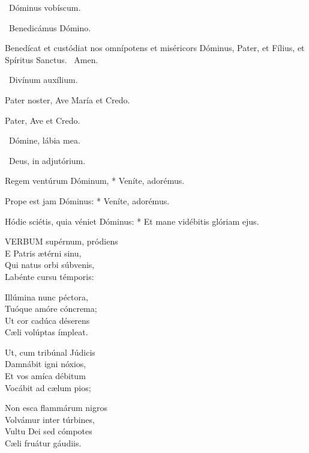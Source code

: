 \V\ Dóminus vobíscum.

\V\ Benedicámus Dómino.

 Benedícat et custódiat nos omnípotens et miséricors Dóminus, Pater, et Fílius, et Spíritus Sanctus. \R\ Amen.


\V\ Divínum auxílium.

Pater noster, Ave María et Credo.

\sectionornament



Pater, Ave et Credo.

\V\ Dómine, lábia mea.

\V\ Deus, in adjutórium.



 Regem ventúrum Dóminum, * Veníte, adorémus.


 Prope est jam Dóminus: * Veníte, adorémus.


 Hódie sciétis, quia véniet Dóminus: * Et mane vidébitis glóriam ejus.


\lettrine[lines=2]{V}{ERBUM} supérnum, pródiens\\
E Patris ætérni sinu,\\
Qui natus orbi súbvenis,\\
Labénte cursu témporis:

Illúmina nunc péctora,\\
Tuóque amóre cóncrema;\\
Ut cor cadúca déserens\\
Cæli volúptas ímpleat.

Ut, cum tribúnal Júdicis\\
Damnábit igni nóxios,\\
Et vos amíca débitum\\
Vocábit ad cælum pios;

Non esca flammárum nigros\\
Volvámur inter túrbines,\\
Vultu Dei sed cómpotes\\
Cæli fruátur gáudiis.

